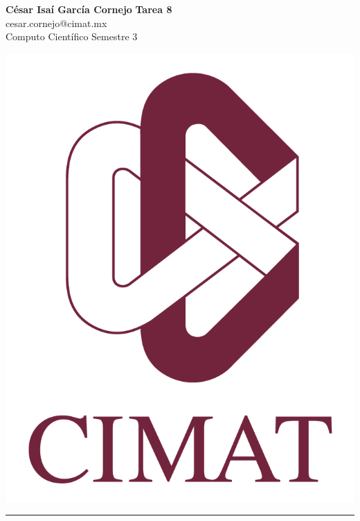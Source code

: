 \documentclass[a4paper, 11pt]{article}
\begin{document}
	\noindent
	
	\begin{minipage}[b][1.2cm][t]{0.8\textwidth}
		\large\textbf{César Isaí García Cornejo} \hfill \textbf{Tarea 8}  \\
		cesar.cornejo@cimat.mx \hfill \\
		\normalsize Computo Científico \hfill Semestre 3\\
	\end{minipage}
	
	\hspace{14.4cm}
	\begin{minipage}[b][0.03cm][t]{0.12\linewidth}
		
		\vspace{-2.2cm}
		\includegraphics[scale=0.3]{Figures/EscudoCimat.png}
	\end{minipage}
	
	\noindent\rule{7in}{2.8pt}
	
\end{document}
